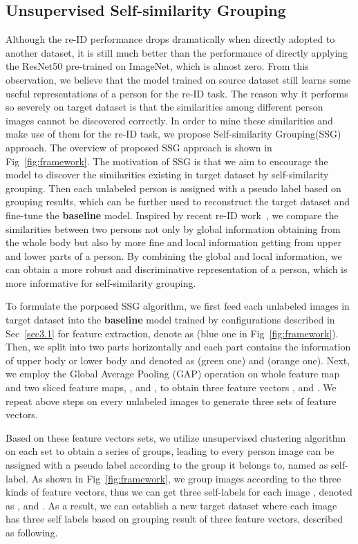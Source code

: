 \documentclass[10pt,twocolumn,letterpaper]{article}
\begin{document}
\subsection{Unsupervised Self-similarity Grouping} \label{sec3.2}
Although the re-ID performance drops dramatically when directly adopted to another dataset, it is still much better than the performance of directly applying the ResNet50 pre-trained on ImageNet, which is almost zero. From this observation, we believe that the model trained on source dataset still learns some useful representations of a person for the re-ID task. The reason why it performs so severely on target dataset is that the similarities among different person images cannot be discovered correctly. In order to mine these similarities and make use of them for the re-ID task, we propose Self-similarity Grouping(SSG) approach. The overview of proposed SSG approach is shown in Fig~\ref{fig:framework}. The motivation of SSG is that we aim to encourage the model to discover the similarities existing in target dataset by self-similarity grouping. Then each unlabeled person is assigned with a pseudo label based on grouping results, which can be further used to reconstruct the target dataset and fine-tune the {\bf baseline} model. Inspired by recent re-ID work~\cite{fu2018horizontal, wang2018learning}, we compare the similarities between two persons not only by global information obtaining from the whole body but also by more fine and local information getting from upper and lower parts of a person. By combining the global and local information, we can obtain a more robust and discriminative representation of a person, which is more informative for self-similarity grouping.

To formulate the porposed SSG algorithm, we first feed each unlabeled images  in target dataset into the {\bf baseline} model trained by configurations described in Sec~\ref{sec3.1} for feature extraction, denote as  (blue one in Fig~\ref{fig:framework}). Then, we split  into two parts horizontally and each part contains the information of upper body or lower body and denoted as  (green one) and  (orange one).
Next, we employ the Global Average Pooling (GAP) operation on whole feature map and two sliced feature maps, \ie ,  and , to obtain three feature vectors ,  and . We repeat above steps on every unlabeled images to generate three sets of feature vectors.
 
Based on these feature vectors sets, we utilize unsupervised clustering algorithm~\cite{ester1996density} on each set to obtain a series of groups, leading to every person image can be assigned with a pseudo label according to the group it belongs to, named as self-label. As shown in Fig~\ref{fig:framework}, we group images according to the three kinds of feature vectors, thus we can get three self-labels for each image , denoted as ,  and . As a result, we can establish a new target dataset where each image has three self labels based on grouping result of three feature vectors, described as following.  
 
\end{document}
